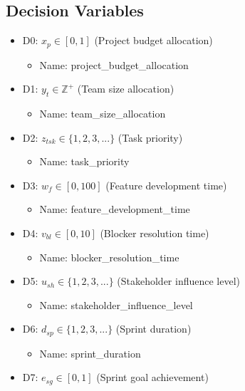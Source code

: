 \documentclass{article}
\begin{document}
\begin{itemize}
\section{Decision Variables}
\begin{itemize}
    \item D0: $x_{p} \in [0, 1]$ (Project budget allocation)
        \begin{itemize}
            \item Name: project\_budget\_allocation
        \end{itemize}
    \item D1: $y_{t} \in \mathbb{Z}^+$ (Team size allocation)
        \begin{itemize}
            \item Name: team\_size\_allocation
        \end{itemize}
    \item D2: $z_{tsk} \in \{1, 2, 3, ...\}$ (Task priority)
        \begin{itemize}
            \item Name: task\_priority
        \end{itemize}
    \item D3: $w_{f} \in [0, 100]$ (Feature development time)
        \begin{itemize}
            \item Name: feature\_development\_time
        \end{itemize}
    \item D4: $v_{bl} \in [0, 10]$ (Blocker resolution time)
        \begin{itemize}
            \item Name: blocker\_resolution\_time
        \end{itemize}
    \item D5: $u_{sh} \in \{1, 2, 3, ...\}$ (Stakeholder influence level)
        \begin{itemize}
            \item Name: stakeholder\_influence\_level
        \end{itemize}
    \item D6: $d_{sp} \in \{1, 2, 3, ...\}$ (Sprint duration)
        \begin{itemize}
            \item Name: sprint\_duration
        \end{itemize}
    \item D7: $e_{sg} \in [0, 1]$ (Sprint goal achievement)
        \begin{itemize}

\end{itemize}
\end{itemize}
\end{itemize}
\end{document}
